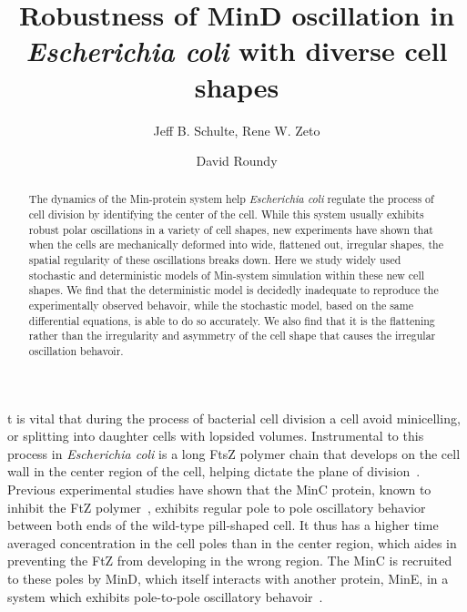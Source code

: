 \documentclass{pnastwo}
\begin{document}
\title{Robustness of MinD oscillation in \emph{Escherichia coli} with
  diverse cell shapes}

\author{Jeff B. Schulte,
Rene W. Zeto
\and
David Roundy}



\maketitle

\begin{article}
\begin{abstract}
  The dynamics of the Min-protein system help \emph{Escherichia coli}
  regulate the process of cell division by identifying the center of
  the cell.  While this system usually exhibits robust polar
  oscillations in a variety of cell shapes, new experiments have shown
  that when the cells are mechanically deformed into wide, flattened
  out, irregular shapes, the spatial regularity of these oscillations
  breaks down. Here we study widely used stochastic and deterministic
  models of Min-system simulation within these new cell shapes.  We
  find that the deterministic model is decidedly inadequate to
  reproduce the experimentally observed behavoir, while the stochastic
  model, based on the same differential equations, is able to do so
  accurately.  We also find that it is the flattening rather than the
  irregularity and asymmetry of the cell shape that causes the
  irregular oscillation behavoir.
\end{abstract}




t is vital that during the process of bacterial cell division a cell
avoid minicelling, or splitting into daughter cells with lopsided
volumes.  Instrumental to this process in \emph{Escherichia coli} is a
long FtsZ polymer chain that develops on the cell wall in the center
region of the cell, helping dictate the plane of
division~\cite{adams2009bacterial, lutkenhaus2007assembly}. Previous
experimental studies have shown that the MinC protein, known to
inhibit the FtZ polymer~\cite{shen2010examination}, exhibits regular
pole to pole oscillatory behavior between both ends of the wild-type
pill-shaped cell.  It thus has a higher time averaged concentration in
the cell poles than in the center region, which aides in preventing
the FtZ from developing in the wrong region.  The MinC is recruited to
these poles by MinD, which itself interacts with another protein,
MinE, in a system which exhibits pole-to-pole oscillatory
behavoir~\cite{hu1999topological, fu2001mine, shapiro2009and,
  yu1999ftsz, raskin1999rapid, meacci2005min, raskin1999minde}.


\end{article}
\end{document}
